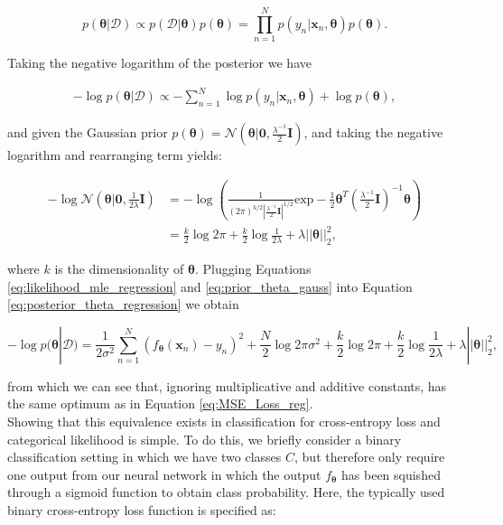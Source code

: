 \begin{equation}
    p(\bm{\theta}|\mathcal{D})\propto p(\mathcal{D}|\bm{\theta})p(\bm{\theta}) = \prod^N_{n=1}p(y_n|\mathbf{x}_n,\bm{\theta})p(\bm{\theta}).
\end{equation}

\noindent Taking the negative logarithm of the posterior we have 

\begin{equation}
\begin{split}
    -\log p(\bm{\theta}|\mathcal{D})\propto -\sum^N_{n=1}\log p(y_n|\mathbf{x}_n,\bm{\theta})+\log p(\bm{\theta}),
\end{split}
\label{eq:posterior_theta_regression}
\end{equation}

\noindent and given the Gaussian prior $p(\bm{\theta})=\mathcal{N}(\bm{\theta}|\mathbf{0}, \frac{\lambda^{-1}}{2}\mathbf{I})$, and taking the negative logarithm and rearranging term yields:

\begin{equation}
\begin{split}
    -\log \mathcal{N}(\bm{\theta}|\mathbf{0}, \frac{1}{2\lambda}\mathbf{I}) & = -\log \left(\frac{1}{(2\pi)^{k/2}|\frac{\lambda^{-1}}{2}\mathbf{I}|^{1/2}}\text{exp}-\frac{1}{2}\bm{\theta}^T(\frac{\lambda^{-1}}{2}\mathbf{I})^{-1}\bm{\theta}\right)\\
    & = \frac{k}{2}\log 2\pi+\frac{k}{2}\log \frac{1}{2\lambda}+\lambda||\bm{\theta}||^2_2,
\end{split}
\label{eq:prior_theta_gauss}
\end{equation}

\noindent where $k$ is the dimensionality of $\bm{\theta}$. Plugging Equations \ref{eq:likelihood_mle_regression} and \ref{eq:prior_theta_gauss} into Equation \ref{eq:posterior_theta_regression} we obtain

\begin{equation}
    -\log p(\bm{\theta}|\mathcal{D}) = \frac{1}{2\sigma^2}\sum^N_{n=1}(f_{\bm{\theta}}(\mathbf{x}_n)-y_n)^2+\frac{N}{2}\log 2\pi\sigma^2 + \frac{k}{2}\log 2\pi+\frac{k}{2}\log \frac{1}{2\lambda}+\lambda||\bm{\theta}||^2_2,
\end{equation}

\noindent from which we can see that, ignoring multiplicative and additive constants, has the same optimum as in Equation \ref{eq:MSE_Loss_reg}.\\

\noindent  Showing that this equivalence exists in classification for cross-entropy loss and categorical likelihood is simple. To do this, we briefly consider a binary classification setting in which we have two classes $C$, but therefore only require one output from our neural network in which the output $f_{\bm{\theta}}$ has been squished through a sigmoid function to obtain class probability. Here, the typically used binary cross-entropy loss function is specified as:


